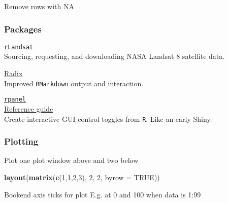 \documentclass[10,portrait]{article}
\newenvironment{Shaded}{\begin{snugshade}}{\end{snugshade}}
\newcommand{\KeywordTok}[1]{\textcolor[rgb]{0.13,0.29,0.53}{\textbf{#1}}}
\newcommand{\DataTypeTok}[1]{\textcolor[rgb]{0.13,0.29,0.53}{#1}}
\newcommand{\DecValTok}[1]{\textcolor[rgb]{0.00,0.00,0.81}{#1}}
\newcommand{\StringTok}[1]{\textcolor[rgb]{0.31,0.60,0.02}{#1}}
\newcommand{\CommentTok}[1]{\textcolor[rgb]{0.56,0.35,0.01}{\textit{#1}}}
\newcommand{\OtherTok}[1]{\textcolor[rgb]{0.56,0.35,0.01}{#1}}
\newcommand{\OperatorTok}[1]{\textcolor[rgb]{0.81,0.36,0.00}{\textbf{#1}}}
\newcommand{\NormalTok}[1]{#1}
\begin{document}
Remove rows with NA

\begin{Shaded}
\end{Shaded}

\subsubsection{Packages}\label{packages}

\href{https://blog.socialcops.com/technology/data-science/announcing-rlandsat-landsat-8-data/}{\texttt{rLandsat}}\\
Sourcing, requesting, and downloading NASA Landsat 8 satellite data.

\href{https://blog.rstudio.com/2018/09/19/radix-for-r-markdown/}{Radix}\\
Improved \texttt{RMarkdown} output and interaction.

\href{http://www.stats.gla.ac.uk/~adrian/rpanel/}{\texttt{rpanel}}\\
\href{https://cran.r-project.org/doc/Rnews/Rnews_2006-4.pdf}{Reference
guide}\\
Create interactive GUI control toggles from \texttt{R}. Like an early
Shiny.

\subsubsection{Plotting}\label{plotting}

Plot one plot window above and two below

\begin{Shaded}
\begin{Highlighting}[]
\KeywordTok{layout}\NormalTok{(}\KeywordTok{matrix}\NormalTok{(}\KeywordTok{c}\NormalTok{(}\DecValTok{1}\NormalTok{,}\DecValTok{1}\NormalTok{,}\DecValTok{2}\NormalTok{,}\DecValTok{3}\NormalTok{), }\DecValTok{2}\NormalTok{, }\DecValTok{2}\NormalTok{, }\DataTypeTok{byrow =} \OtherTok{TRUE}\NormalTok{))}
\end{Highlighting}
\end{Shaded}

Bookend axis ticks for plot E.g. at 0 and 100 when data is 1:99

\begin{Shaded}
\end{Shaded}
\end{document}
